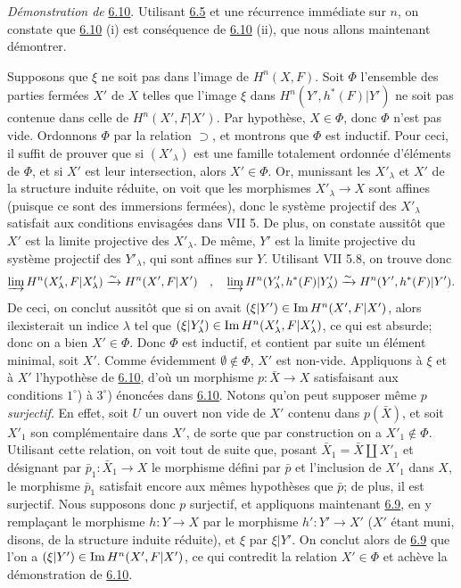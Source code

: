 \documentclass[10pt]{../fichiers-configuration-latex/smfart}
\begin{document}
\noindent
\emph{Démonstration de} \hyperref[XII.cor6.10]{6.10}. Utilisant \hyperref[XII.prop6.5]{6.5} 
et une récurrence
immédiate sur $n$, on constate que \hyperref[XII.cor6.10]{6.10} (i) est conséquence de 
\hyperref[XII.cor6.10]{6.10} (ii), que nous allons maintenant démontrer.

Supposons que $\xi$ ne soit pas dans l'image de $H^n(X,F)$. Soit
$\Phi$ l'ensemble des parties fermées $X'$ de $X$ telles que l'image
$\xi$ dans $H^n(Y',h^{\ast}(F)| Y')$ ne soit pas contenue dans
celle de $H^n(X',F| X')$. Par hypothèse, $X\in \Phi$, donc $\Phi$
n'est pas vide. Ordonnons $\Phi$ par la relation $\supset$, et
montrons que $\Phi$ est inductif. Pour ceci, il suffit de prouver que
si $(X'_{\lambda})$ est une famille totalement ordonnée d'éléments de
$\Phi$, et si $X'$ est leur intersection, alors $X'\in \Phi$. Or,
munissant les $X'_{\lambda}$ et $X'$ de la structure induite 
réduite, on voit que les morphismes $X'_{\lambda}\rightarrow
X$ sont affines (puisque ce sont des immersions fermées), donc le
système projectif des $X'_{\lambda}$ satisfait aux conditions
envisagées dans VII 5. De plus, on constate aussitôt que $X'$ est la
limite projective des $X'_{\lambda}$. De même, $Y'$ est la limite
projective du système projectif des $Y'_{\lambda}$, qui sont affines
sur $Y$. Utilisant VII 5.8, on trouve donc
$$
\varinjlim H^n(X'_{\lambda},F|X'_{\lambda})\xrightarrow{\sim}
H^n(X',F|X')\quad,\quad \varinjlim H^n(Y'_{\lambda},
h^{\ast}(F)|Y'_{\lambda})\xrightarrow{\sim}
H^n(Y',h^{\ast}(F)|Y'){}.
$$
De ceci, on conclut aussitôt que si on avait $(\xi|Y')\in \operatorname{Im}
H^n(X',F|X')$, alors il\pageoriginale existerait un indice $\lambda$
tel que $(\xi|Y'_{\lambda})\in \operatorname{Im} H^n(X'_{\lambda},F|X'_{\lambda})$, ce
qui est absurde; donc on a bien $X'\in \Phi$. Donc $\Phi$ est
inductif, et contient par suite un élément minimal, soit $X'$. Comme
évidemment $∅\not\in \Phi$, $X'$ est non-vide. Appliquons à $\xi$
et à $X'$ l'hypothèse de \hyperref[XII.cor6.10]{6.10}, d'où un morphisme $p:\bar{X}\rightarrow
X$ satisfaisant aux conditions $1^{\circ}$) à $3^{\circ}$) énoncées
dans \hyperref[XII.cor6.10]{6.10}. Notons qu'on peut supposer même $p$ \emph{surjectif}. En
effet, soit $U$ un ouvert non vide de $X'$ contenu dans $p(\bar{X})$,
et soit $X'_1$ son complémentaire dans $X'$, de sorte que par
construction on a $X'_1\not\in \Phi$. Utilisant cette relation, on
voit tout de suite que, posant $\bar{X}_1=\bar{X}\amalg X'_1$ et
désignant par $\bar{p}_1:\bar{X}_1\rightarrow X$ le morphisme défini
par $\bar{p}$ et l'inclusion de $X'_1$ dans $X$, le morphisme
$\bar{p}_1$ satisfait encore aux mêmes hypothèses que $\bar{p}$; de
plus, il est surjectif. Nous supposons donc $p$ surjectif, et
appliquons maintenant \hyperref[XII.cor6.9]{6.9}, en y remplaçant le morphisme
$h:Y\rightarrow X$ par le morphisme $h':Y'\rightarrow X'$ ($X'$ étant
muni, disons, de la structure induite réduite), et $\xi$ par
$\xi|Y'$. On conclut alors de \hyperref[XII.cor6.9]{6.9} que l'on a $(\xi|Y')\in \operatorname{Im}
H^n(X',F|X')$, ce qui contredit la relation $X'\in \Phi$ et achève la
démonstration de \hyperref[XII.cor6.10]{6.10}.
\end{document}
